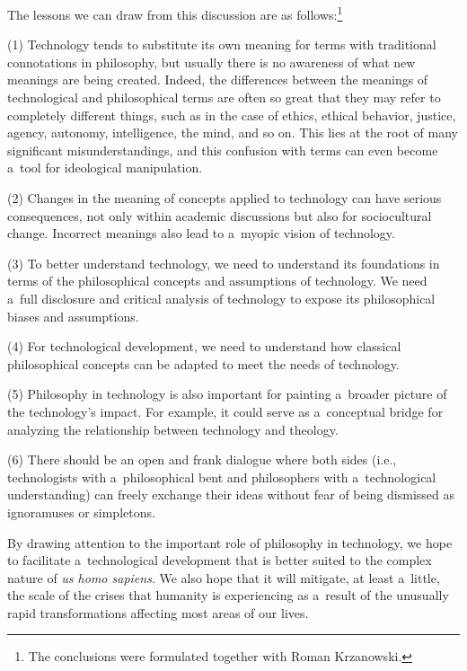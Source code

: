 The lessons we can draw from this discussion are as follows:\footnote{The conclusions were formulated together with Roman Krzanowski.}



(1) Technology tends to substitute its own meaning for terms with traditional connotations in philosophy, but usually there is no awareness of what new meanings are being created. Indeed, the differences between the meanings of technological and philosophical terms are often so great that they may refer to completely different things, such as in the case of ethics, ethical behavior, justice, agency, autonomy, intelligence, the mind, and so on. This lies at the root of many significant misunderstandings, and this confusion with terms can even become a~tool for ideological manipulation.



(2) Changes in the meaning of concepts applied to technology can have serious consequences, not only within academic discussions but also for sociocultural change. Incorrect meanings also lead to a~myopic vision of technology.



(3) To better understand technology, we need to understand its foundations in terms of the philosophical concepts and assumptions of technology. We need a~full disclosure and critical analysis of technology to expose its philosophical biases and assumptions.



(4) For technological development, we need to understand how classical philosophical concepts can be adapted to meet the needs of technology.



(5) Philosophy in technology is also important for painting a~broader picture of the technology's impact. For example, it could serve as a~conceptual bridge for analyzing the relationship between technology and theology.



(6) There should be an open and frank dialogue where both sides (i.e., technologists with a~philosophical bent and philosophers with a~technological understanding) can freely exchange their ideas without fear of being dismissed as ignoramuses or simpletons.



By drawing attention to the important role of philosophy in technology, we hope to facilitate a~technological development that is better suited to the complex nature of \textit{us homo sapiens}. We also hope that it will mitigate, at least a~little, the scale of the crises that humanity is experiencing as a~result of the unusually rapid transformations affecting most areas of our lives.



